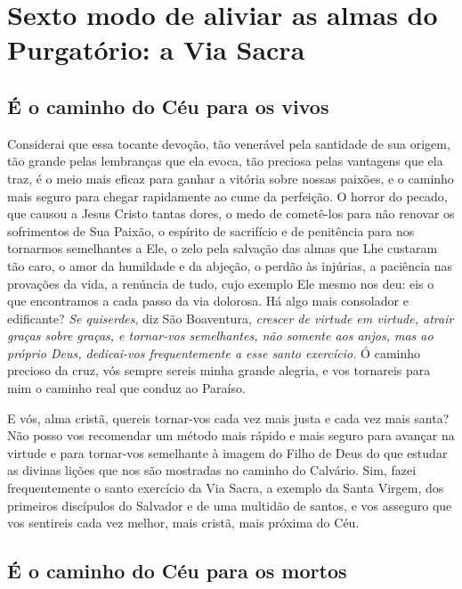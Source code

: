 \renewcommand{\thechapterdisplay}{Vigésimo quinto dia}
\renewcommand{\thechapterrunner}{Sexto modo de aliviar as almas do Purgatório: a Via Sacra}
\chapter[Vigésimo quinto dia --- Sexto modo de aliviar as almas do Purgatório: a Via Sacra]{Sexto modo de aliviar as almas do Purgatório: a Via Sacra}
\section*{É o caminho do Céu para os vivos}

Considerai que essa tocante devoção, tão venerável pela santidade de sua origem, tão grande pelas lembranças que ela evoca, tão preciosa pelas vantagens que ela traz, é o meio mais eficaz para ganhar a vitória sobre nossas paixões, e o caminho mais seguro para chegar rapidamente ao cume da perfeição. O horror do pecado, que causou a Jesus Cristo tantas dores, o medo de cometê-los para não renovar os sofrimentos de Sua Paixão, o espírito de sacrifício e de penitência para nos tornarmos semelhantes a Ele, o zelo pela salvação das almas que Lhe custaram tão caro, o amor da humildade e da abjeção, o perdão às injúrias, a paciência nas provações da vida, a renúncia de tudo, cujo exemplo Ele mesmo nos deu: eis o que encontramos a cada passo da via dolorosa. Há algo mais consolador e edificante? \textit{Se quiserdes}, diz São Boaventura, \textit{crescer de virtude em virtude, atrair graças sobre graças, e tornar-vos semelhantes, não somente aos anjos, mas ao próprio Deus, dedicai-vos frequentemente a esse santo exercício.} Ó caminho precioso da cruz, vós sempre sereis minha grande alegria, e vos tornareis para mim o caminho real que conduz ao Paraíso.

E vós, alma cristã, quereis tornar-vos cada vez mais justa e cada vez mais santa? Não posso vos recomendar um método mais rápido e mais seguro para avançar na virtude e para tornar-vos semelhante à imagem do Filho de Deus do que estudar as divinas lições que nos são mostradas no caminho do Calvário. Sim, fazei frequentemente o santo exercício da Via Sacra, a exemplo da Santa Virgem, dos primeiros discípulos do Salvador e de uma multidão de santos, e vos asseguro que vos sentireis cada vez melhor, mais cristã, mais próxima do Céu.


\section*{É o caminho do Céu para os mortos}

